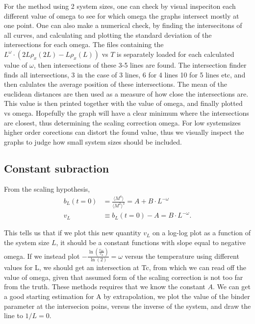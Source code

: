 For the method using 2 system sizes, one can check by visual inspeciton each different value of omega to see for which omega the graphs intersect mostly at one point. One can also make a numerical check, by finding the intersecitons of all curves, and calculating  and plotting the standard deviation of the intersections for each omega.
The files containing the $L^{\omega}\cdot (2L\rho_x(2L) - L\rho_x(L))$ vs $T$ is separately loaded for each calculated value of $\omega$, then intersections of these 3-5 lines are found. 
The intersection finder finds all intersections, 3 in the case of 3 lines, 6 for 4 lines 10 for 5 lines etc, and then calulates the average position of these intersections. The mean of the euclidean distances are then used as a measure of how close the intersections are. This value is then printed together with the value of omega, and finally plotted vs omega.
Hopefully the graph will have a clear minimum where the intersections are closest, thus determining the scaling correction omega.
For low systemsizes higher order corections can distort the found value, thus we visually inspect the graphs to judge how small system sizes should be included. 
\subsection{Constant subraction}
From the scaling hypothesis, 
\begin{align}
  b_L(t=0) &= \frac{\langle M^4 \rangle}{\langle M^2\rangle^2} = A + B\cdot L^{-\omega}\\
  v_L &\equiv b_L(t=0) -A = B\cdot L^{-\omega}.
\end{align}

This tells us that if we plot this new quantity $v_L$ on a log-log plot as a function of the system size $L$, it should be a constant functions with slope equal to negative omega.
If we instead plot $-\frac{\ln\left(\frac{v_{2L}}{v_L}\right)}{\ln(2)} = \omega$ versus the temperature using different values for L, we should get an intersection at Tc, from which we can read off the value of omega, given that assumed form of the scaling correction is not too far from the truth.
These methods requires that we know the constant $A$.
We can get a good starting estimation for A by extrapolation,
we plot the value of the binder parameter at the intersecion poins, versus the inverse of the system, and draw the line to $1/L = 0$.
